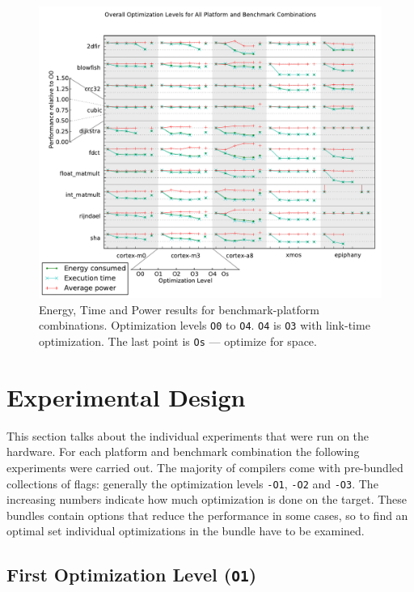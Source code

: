 \documentclass[twocolumn]{article}
\let\oldcaption\caption
\renewcommand{\caption}[1]{\oldcaption{\textup{#1}}}
\begin{document}
\begin{figure}[tb!]
	\centering
	\includegraphics[width=\textwidth,clip, trim=0cm 0cm 0 2.1cm]{levels.pdf}
	\caption{Energy, Time and Power results for benchmark-platform combinations. Optimization levels \texttt{O0} to \texttt{O4}. \texttt{O4} is \texttt{O3} with link-time optimization. The last point is \texttt{Os} --- optimize for space. }
	\label{Fig:OverallView}
\end{figure}

\section{Experimental Design}

This section talks about the individual experiments that were run on the hardware. For each platform and benchmark combination the following experiments were carried out. The majority of compilers come with pre-bundled collections of flags: generally the optimization levels \texttt{-O1}, \texttt{-O2} and \texttt{-O3}. The increasing numbers indicate how much optimization is done on the target. These bundles contain options that reduce the performance in some cases, so to find an optimal set individual optimizations in the bundle have to be examined.

\subsection*{First Optimization Level (\texttt{O1})}
\end{document}
